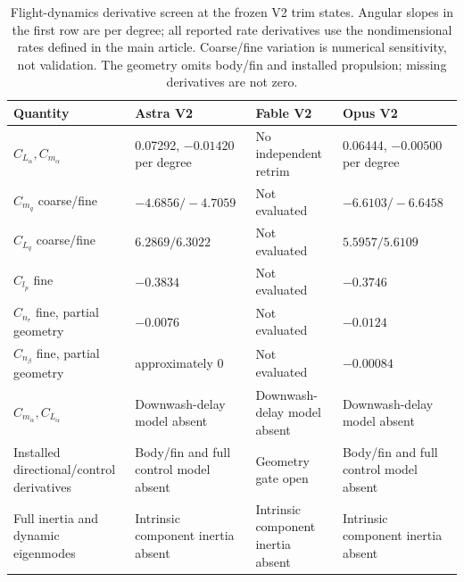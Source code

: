 \documentclass[11pt,a4paper]{article}
\begin{document}
\begin{table}[H]\centering\footnotesize
\caption{Flight-dynamics derivative screen at the frozen V2 trim states. Angular slopes in the first row are per degree; all reported rate derivatives use the nondimensional rates defined in the main article. Coarse/fine variation is numerical sensitivity, not validation. The geometry omits body/fin and installed propulsion; missing derivatives are not zero.}\label{tab:derivativegate}
\begin{tabularx}{\linewidth}{lXXX}\toprule
Quantity & Astra V2 & Fable V2 & Opus V2\\\midrule
$C_{L_\alpha},C_{m_\alpha}$ & 0.07292, $-0.01420$ per degree & No independent retrim & 0.06444, $-0.00500$ per degree\\
$C_{m_q}$ coarse/fine & $-4.6856/-4.7059$ & Not evaluated & $-6.6103/-6.6458$\\
$C_{L_q}$ coarse/fine & $6.2869/6.3022$ & Not evaluated & $5.5957/5.6109$\\
$C_{l_p}$ fine & $-0.3834$ & Not evaluated & $-0.3746$\\
$C_{n_r}$ fine, partial geometry & $-0.0076$ & Not evaluated & $-0.0124$\\
$C_{n_\beta}$ fine, partial geometry & approximately 0 & Not evaluated & $-0.00084$\\
$C_{m_{\dot\alpha}},C_{L_{\dot\alpha}}$ & Downwash-delay model absent & Downwash-delay model absent & Downwash-delay model absent\\
Installed directional/control derivatives & Body/fin and full control model absent & Geometry gate open & Body/fin and full control model absent\\
Full inertia and dynamic eigenmodes & Intrinsic component inertia absent & Intrinsic component inertia absent & Intrinsic component inertia absent\\\bottomrule
\end{tabularx}
\end{table}
\end{document}
